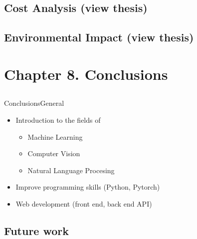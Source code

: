 \documentclass{beamer}
\begin{document}
\subsection{Cost Analysis (view thesis)}


\subsection{Environmental Impact (view thesis)}



\section{Chapter 8. Conclusions}

\subsection*{}

\begin{frame}{Conclusions}{General}
  \begin{itemize}
    \item Introduction to the fields of
    \begin{itemize}
      \item Machine Learning
      \item Computer Vision
      \item Natural Language Procesing
    \end{itemize}
    \item Improve programming skills (Python, Pytorch)
    \item Web development (front end, back end API)
  \end{itemize}
\end{frame}

\subsection{Future work}
\end{document}
